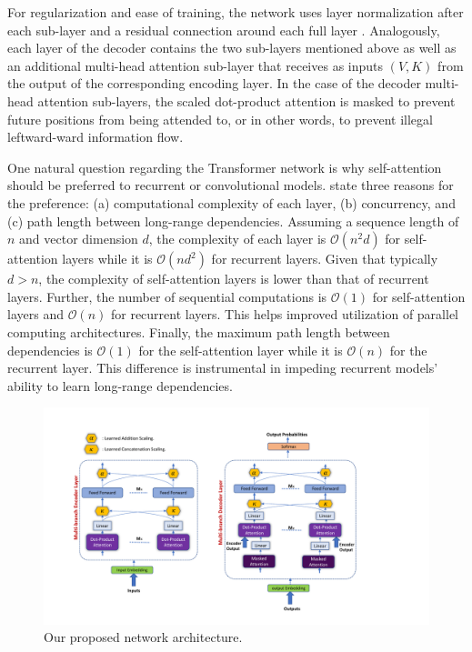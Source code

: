\documentclass{article} %
\begin{document}
For regularization and ease of training, the network uses layer normalization \citep{ba2016layer} after each sub-layer and a residual connection around each full layer \citep{he2016deep}. Analogously, each layer of the decoder contains the two sub-layers mentioned above as well as an additional multi-head attention sub-layer that receives as inputs $(V,K)$ from the output of the corresponding encoding layer. 
In the case of the decoder multi-head attention sub-layers, the scaled dot-product attention is masked to prevent future positions from being attended to, or in other words, to prevent illegal leftward-ward information flow.

One natural question regarding the Transformer network is why self-attention should be preferred to recurrent or convolutional models. \citet{vaswani2017attention} state three reasons for the preference: (a) computational complexity of each layer, (b) concurrency, and (c) {path length} between long-range dependencies. Assuming a sequence length of $n$ and vector dimension $d$, the complexity of each layer is $\mathcal{O}(n^2d)$ for self-attention layers while it is $\mathcal{O}(nd^2)$ for recurrent layers. Given that typically $d > n$, the complexity of self-attention layers is lower than that of recurrent layers. Further, the number of sequential computations is $\mathcal{O}(1)$ for self-attention layers and $\mathcal{O}(n)$ for recurrent layers. This helps improved utilization of parallel computing architectures. Finally, the maximum path length between dependencies is $\mathcal{O}(1)$ for the self-attention layer while it is $\mathcal{O}(n)$ for the recurrent layer. This difference is instrumental in impeding recurrent models' ability to learn long-range dependencies. 

\begin{figure}
\begin{center}
  \includegraphics[width=1.0\linewidth]{model.pdf}
\end{center}
\caption{Our proposed network architecture. \label{fig:model}}
\end{figure}
\end{document}
